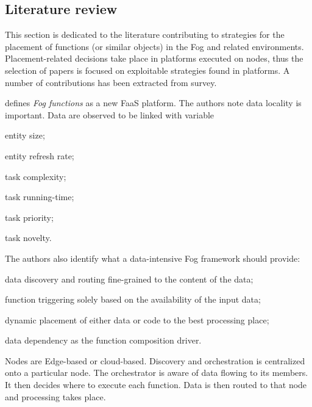 \subsection{Literature review \label{sec:literature_review}}

This section is dedicated to the literature contributing to strategies for the placement of functions (or similar objects) in the Fog and related environments. Placement-related decisions take place in platforms executed on nodes, thus the selection of papers is focused on exploitable strategies found in platforms. A number of contributions has been extracted from  survey.

\begin{description}[leftmargin=10pt]
	\item[\citet{cheng_fog_2019}] defines \textit{Fog functions} as a new \gls{FaaS} platform. The authors note data locality is important. Data are observed to be linked with variable
		\begin{enumerate*}[(i)]
			\item entity size;
			\item entity refresh rate;
			\item task complexity;
			\item task running-time;
			\item task priority;
			\item task novelty.
		\end{enumerate*}
		The authors also identify what a data-intensive Fog framework should provide:
		\begin{enumerate*}[(a)]
			\item data discovery and routing fine-grained to the content of the data;
			\item function triggering solely based on the availability of the input data;
			\item dynamic placement of either data or code to the best processing place;
			\item data dependency as the function composition driver.
		\end{enumerate*}
		Nodes are Edge-based or cloud-based. Discovery and orchestration is centralized onto a particular node. The orchestrator is aware of data flowing to its members. It then decides where to execute each function. Data is then routed to that node and processing takes place.


\end{description}
